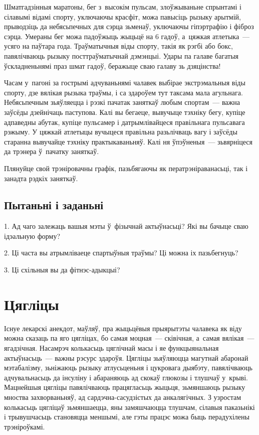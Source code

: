 Шматгадзінныя маратоны, бег з~высокім пульсам, злоўжываньне спрынтамі і сілавымі відамі спорту, уключаючы красфіт, можа павысіць рызыку арытмій, прыводзіць да небясьпечных для сэрца зьменаў, уключаючы гіпэртрафію і фіброз сэрца. Умераны бег можа падоўжыць жыцьцё на 6 гадоў, а~цяжкая атлетыка~--- усяго на паўтара года. Траўматычныя віды спорту, такія як рэгбі або бокс, павялічваюць рызыку посттраўматычнай дэмэнцыі. Удары па галаве багатыя ўскладненьнямі праз шмат гадоў, беражыце сваю галаву зь дзяцінства!

Часам у~пагоні за гострымі адчуваньнямі чалавек выбірае экстрэмальныя віды спорту, дзе вялікая рызыка траўмы, і са здароўем тут таксама мала агульнага. Небясьпечным зьяўляецца і рэзкі пачатак заняткаў любым спортам~--- важна заўсёды дзейнічаць паступова. Калі вы бегаеце, вывучыце тэхніку бегу, купіце адпаведны абутак, купіце пульсамер і датрымлівайцеся правільнага пульсавага рэжыму. У цяжкай атлетыцы вучыцеся правільна разьлічваць вагу і заўсёды старанна вывучайце тэхніку практыкаваньняў. Калі ня ўпэўненыя~--- зьвярніцеся да трэнера ў~пачатку заняткаў.

Плянуйце свой трэніровачны графік, пазьбягаючы як ператрэніраванасьці, так і занадта рэдкіх заняткаў.

\subsection*{Пытаньні і заданьні}

1. Ад чаго залежаць вашыя мэты ў~фізычнай актыўнасьці? Які вы бачыце сваю ідэальную форму?

2. Ці часта вы атрымліваеце спартыўныя траўмы? Ці можна іх пазьбегнуць?

3. Ці схільныя вы да фітнэс-адыкцыі?


\section{Цягліцы}

Існуе лекарскі анекдот, маўляў, пра жыцьцёвыя прыярытэты чалавека як віду можна сказаць па яго цягліцах, бо самая моцная~--- сківічная, а~самая вялікая~--- ягадзічная. Насамрэч колькасьць цяглічнай масы і яе функцыянальная актыўнасьць~--- важны рэсурс здароўя. Цягліцы зьяўляюцца магутнай абаронай мэтабалізму, зьніжаюць рызыку атлусьценьня і цукровага дыябэту, павялічваюць адчувальнасьць да інсуліну і абараняюць ад скокаў глюкозы і тлушчаў у~крыві. Мацнейшыя цягліцы павялічваюць працягласьць жыцьця, зьмяншаюць рызыку мноства захворваньняў, ад сардэчна-сасудзістых да анкалягічных. З узростам колькасьць цягліцаў зьмяншаецца, яны замяшчаюцца тлушчам, сілавыя паказьнікі і трывушчасьць становяцца меншымі, але гэты працэс можа быць перадухілены трэніроўкамі.

